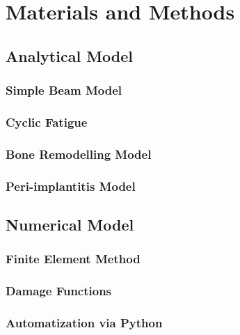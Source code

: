 
\chapter{Materials and Methods}
\label{chap:MatAndMet}

\section{Analytical Model}

\subsection{Simple Beam Model}

\subsection{Cyclic Fatigue}

\subsection{Bone Remodelling Model}

\subsection{Peri-implantitis Model}


\section{Numerical Model}

\subsection{Finite Element Method}

\subsection{Damage Functions}

\subsection{Automatization via Python}
